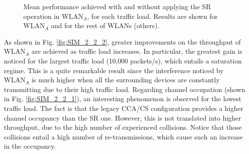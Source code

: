 \documentclass[comsoc]{IEEEtran}
\begin{document}
	\begin{figure}[ht!]
		\centering		
		\caption{Mean performance achieved with and without applying the SR operation in $\text{WLAN}_A$, for each traffic load. Results are shown for $\text{WLAN}_A$ and for the rest of WLANs (others).}
		\label{fig:SIM_2_2}
	\end{figure}
	
	As shown in Fig. \ref{fig:SIM_2_2_2}, greater improvements on the throughput of $\text{WLAN}_A$ are achieved as traffic load increases. In particular, the greatest gain is noticed for the largest traffic load (10,000 packets/s), which entails a saturation regime. This is a quite remarkable result since the interference noticed by $\text{WLAN}_A$ is much higher when all the surrounding devices are constantly transmitting due to their high traffic load. Regarding channel occupation (shown in Fig. \ref{fig:SIM_2_2_1}), an interesting phenomenon is observed for the lowest traffic load. The fact is that the legacy CCA/CS configuration provides a higher channel occupancy than the SR one. However, this is not translated into higher throughput, due to the high number of experienced collisions. Notice that those collisions entail a high number of re-transmissions, which cause such an increase in the occupancy.
	
\end{document}
